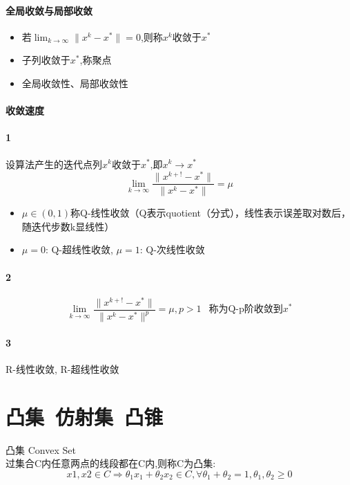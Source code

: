 \documentclass{mytemplate}
\begin{document}
\paragraph*{全局收敛与局部收敛}
\begin{itemize}
    \item 若$\lim_{k \rightarrow \infty} \|x^k - x^*\| = 0$,则称${x^k}$收敛于$x^*$
    \item 子列收敛于$x^*$,称聚点
    \item 全局收敛性、局部收敛性
\end{itemize}

\paragraph*{收敛速度}
\paragraph{1} 设算法产生的迭代点列${x^k}$收敛于$x^*$,即$x^k \rightarrow x^*$ \\
\[
    \lim_{k \rightarrow \infty} \frac{\|x^{k+!} - x^*\|}{\|x^{k} - x^*\|} = \mu
\]
\begin{itemize}
    \item $\mu \in (0, 1)$称Q-线性收敛（Q表示quotient（分式），线性表示误差取对数后，随迭代步数k显线性）
    \item $\mu = 0$:  Q-超线性收敛,  $\mu = 1$:  Q-次线性收敛
\end{itemize}
\paragraph{2}
\[
    \lim_{k \rightarrow \infty} \frac{\|x^{k+!} - x^*\|}{\|x^{k} - x^*\|^p} = \mu , p > 1 \ \ \text{   称为Q-p阶收敛到}x^*
\]
\paragraph{3}
R-线性收敛, R-超线性收敛 \newpage
\section{凸集\ 仿射集\ 凸锥}
\begin{definition}{凸集 Convex Set}\\
    过集合C内任意两点的线段都在C内,则称C为凸集:
    \[x1,x2 \in C \Rightarrow \theta_1 x_1 + \theta_2 x_2 \in C
        , \forall \theta_1 + \theta_2 = 1,\theta_1,\theta_2 \geq 0
    \]
\end{definition}
\end{document}
